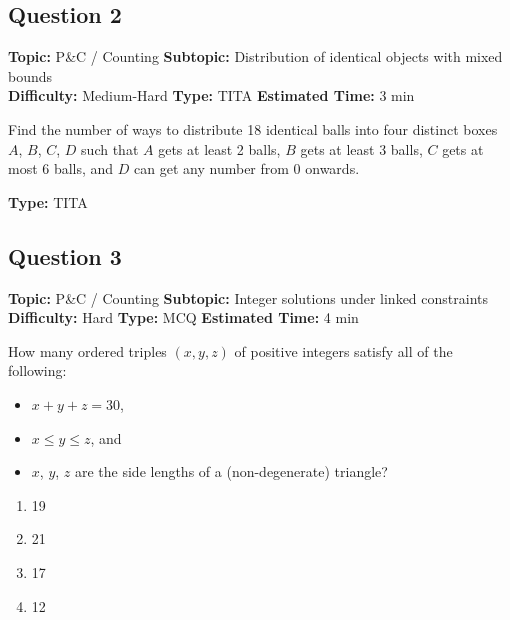 \documentclass[11pt,a4paper]{article}
\begin{document}
\subsection*{Question 2}
\textbf{Topic:} P\&C / Counting \quad
\textbf{Subtopic:} Distribution of identical objects with mixed bounds \\
\textbf{Difficulty:} Medium-Hard \quad
\textbf{Type:} TITA \quad
\textbf{Estimated Time:} 3 min
\begin{tcolorbox}[qbox]
Find the number of ways to distribute 18 identical balls into four distinct boxes \(A\), \(B\), \(C\), \(D\) such that \(A\) gets at least 2 balls, \(B\) gets at least 3 balls, \(C\) gets at most 6 balls, and \(D\) can get any number from 0 onwards.
\end{tcolorbox}
\textbf{Type:} TITA

\subsection*{Question 3}
\textbf{Topic:} P\&C / Counting \quad
\textbf{Subtopic:} Integer solutions under linked constraints \\
\textbf{Difficulty:} Hard \quad
\textbf{Type:} MCQ \quad
\textbf{Estimated Time:} 4 min
\begin{tcolorbox}[qbox]
How many ordered triples \((x, y, z)\) of positive integers satisfy all of the following:
\begin{itemize}[leftmargin=*,topsep=0pt,itemsep=0pt]
    \item \(x + y + z = 30\),
    \item \(x \leq y \leq z\), and
    \item \(x\), \(y\), \(z\) are the side lengths of a (non-degenerate) triangle?
\end{itemize}
\end{tcolorbox}
\begin{enumerate}[label=(\Alph*)]
\item 19
\item 21
\item 17
\item 12
\end{enumerate}

\end{document}
